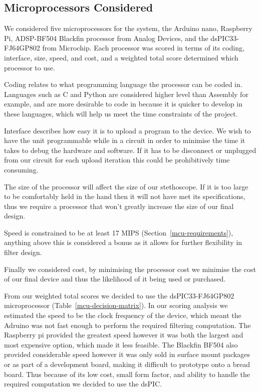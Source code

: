 \subsection{Microprocessors Considered}
We considered five microprocessors for the system, the Arduino nano, Raspberry Pi, ADSP-BF504 Blackfin processor from Analog Devices, and the dsPIC33-FJ64GP802 from Microchip. Each processor was scored in terms of its coding, interface, size, speed, and cost, and a weighted total score determined which processor to use. 

Coding relates to what programming language the processor can be coded in. Languages such as C and Python are considered higher level than Assembly for example, and are more desirable to code in because it is quicker to develop in these languages, which will help us meet the time constraints of the project. 

Interface describes how easy it is to upload a program to the device. We wish to have the unit programmable while in a circuit in order to minimise the time it takes to debug the hardware and software. If it has to be disconnect or unplugged from our circuit for each upload iteration this could be prohibitively time consuming. 

The size of the processor will affect the size of our stethoscope. If it is too large to be comfortably held in the hand then it will not have met its specifications, thus we require a processor that won't greatly increase the size of our final design.

Speed is constrained to be at least 17 MIPS (Section~\ref{mcu-requirements}), anything above this is considered a bonus as it allows for further flexibility in filter design. 

Finally we considered cost, by minimising the processor cost we minimise the cost of our final device and thus the likelihood of it being used or purchased.

From our weighted total scores we decided to use the dsPIC33-FJ64GP802 microprocessor (Table~\ref{mcu-decision-matrix}). In our scoring analysis we estimated the speed to be the clock frequency of the device, which meant the Adruino was not fast enough to perform the required filtering computation. The Raspberry pi provided the greatest speed however it was both the largest and most expensive option, which made it less feasible. The Blackfin BF504 also provided considerable speed however it was only sold in surface mount packages or as part of a development board, making it difficult to prototype onto a bread board. Thus because of its low cost, small form factor, and ability to handle the required computation we decided to use the dsPIC.



